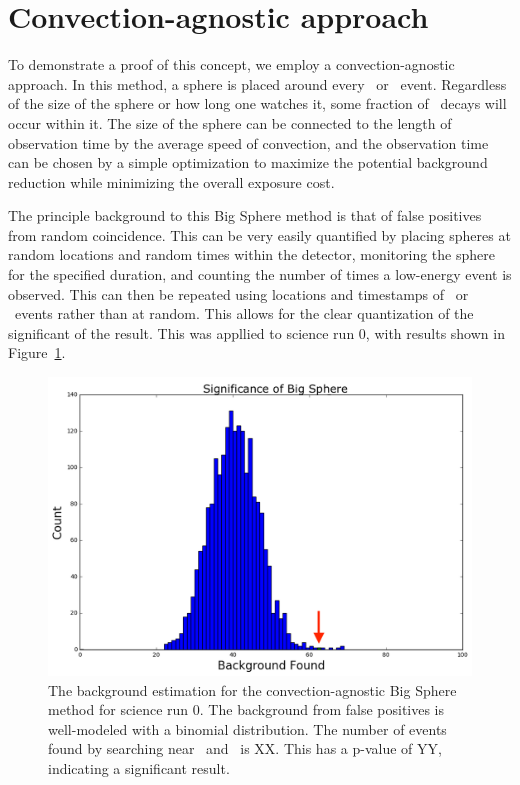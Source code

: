 \section{Convection-agnostic approach}

To demonstrate a proof of this concept, we employ a convection-agnostic approach. In this method, a sphere is placed around every \Po~or \BiPo~event. Regardless of the size of the sphere or how long one watches it, some fraction of \Pb~decays will occur within it. The size of the sphere can be connected to the length of observation time by the average speed of convection, and the observation time can be chosen by a simple optimization to maximize the potential background reduction while minimizing the overall exposure cost.

The principle background to this Big Sphere method is that of false positives from random coincidence. This can be very easily quantified by placing spheres at random locations and random times within the detector, monitoring the sphere for the specified duration, and counting the number of times a low-energy event is observed. This can then be repeated using locations and timestamps of \Po~or \BiPo~events rather than at random. This allows for the clear quantization of the significant of the result. This was appllied to science run 0, with results shown in Figure~\ref{fig:bs_sr0}.

\begin{figure}[htb]
    \includegraphics[width=\textwidth]{figures/rnveto/BigSphere}
    \caption{The background estimation for the convection-agnostic Big Sphere method for science run 0. The background from false positives is well-modeled with a binomial distribution. The number of events found by searching near \Po~and \BiPo~is XX. This has a p-value of YY, indicating a significant result.}\label{fig:bs_sr0}
\end{figure}

